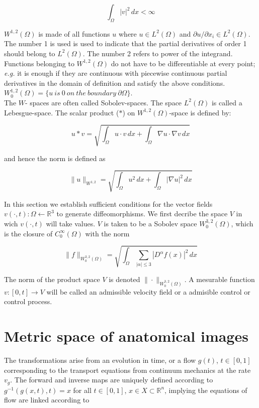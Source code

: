 \documentclass[final, paper=letter,5p,times,twocolumn]{elsarticle}
\theoremstyle{definition}
\begin{document}
$$
\int_{\Omega} |v|^{2} \, dx < \infty
$$

$W^{1,2}(\Omega)$ is made of all functions $u$ where $u \in L^{2}(\Omega)$ and $\partial u / \partial x_{i} \in L^{2}(\Omega)$. The number 1 is used is used to indicate that the partial derivatives of order 1 should belong to $L^{2}(\Omega)$. The number 2 refers to power of the integrand. Functions belonging to $W^{1,2}(\Omega)$ do not have to be differentiable at every point; {\it e.g.} it is enough if they are continuous with piecewise continuous partial derivatives in the domain of definition and satisfy the above conditions. $W^{1,2}_{0}(\Omega) = \{ u~is~0~on~the~boundary~\partial \Omega\}$.\\

The $W$- spaces are often called Sobolev-spaces. The space $L^{2}(\Omega)$ is called a Lebesgue-space.
The scalar product ($*$) on $W^{1,2}(\Omega)$-space is defined by:

$$
u*v = \sqrt{\int_{\Omega} u \cdot v \, dx + \int_{\Omega} \nabla u \cdot \nabla v \, dx}
$$

and hence the norm is defined as

$$
\| u \|_{W^{1,2}}= \sqrt{\int_{\Omega} u^{2} \, dx + \int_{\Omega} |\nabla u|^{2} \, dx}
$$

In this section we establish sufficient conditions for the vector fields $v(\cdot,t):\Omega \leftarrow \mathbb{R}^{3}$ to generate diffeomorphisms. We first decribe the space $V$ in wich $v(\cdot,t)$ will take values. $V$ is taken to be a Sobolev space $W_{0}^{3,2}(\Omega)$, which is the closure of $C_{0}^{\infty}(\Omega)$ with the norm

$$
\| f \|_{W_{0}^{3,2}(\Omega)} = \sqrt{\int_{\Omega} \sum_{| \alpha | \le 3 } |D^{\alpha} f(x)|^{2} \, dx }
$$

The norm of the product space $V$ is denoted $\| \cdot \|_{W_{0}^{3,2}(\Omega)}$. A mesurable function $v:[0,t] \rightarrow V$ will be called an admissible velocity field or a admisible control or control process.

\section{Metric space of anatomical images}

The transformations arise from an evolution in time, or a flow $g(t)$, $t \in [0, 1]$ corresponding to the transport equations from continuum mechanics at the rate $v_{g}$. The forward and inverse maps are uniquely defined according to $g^{-1}(g(x, t), t) = x$ for all $t \in [0, 1]$, $x \in X \subset \mathbb{R}^{n}$, implying the equations of flow are linked according to
\end{document}

